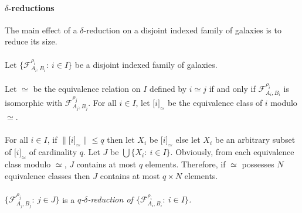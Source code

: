 \documentclass[draft]{article}
\begin{document}
\paragraph{$\delta$-reductions}
%
%
The main effect of a $\delta$-reduction on a disjoint indexed family of galaxies is to reduce its size.
%
%
\\
\\
%
%
%
%
Let $\{{\mathcal F}_{A_{i},B_{i}}^{\rho_{i}}:\ i{\in}I\}$ be a disjoint indexed family of galaxies.
%
%
\\
\\
%
%
Let $\simeq$ be the equivalence relation on $I$ defined by $i{\simeq}j$ if and only if ${\mathcal F}_{A_{i},B_{i}}^{\rho_{i}}$ is isomorphic with ${\mathcal F}_{A_{j},B_{j}}^{\rho_{j}}$.
For all $i{\in}I$, let $\lbrack i\rbrack_{\simeq}$ be the equivalence class of $i$ modulo $\simeq$.
%
%
\\
\\
%
%
For all $i{\in}I$, if ${\parallel}\lbrack i\rbrack_{\simeq}{\parallel}{\leq}q$ then let $X_{i}$ be $\lbrack i\rbrack_{\simeq}$ else let $X_{i}$ be an arbitrary subset of $\lbrack i\rbrack_{\simeq}$ of cardinality $q$.
Let $J$ be $\bigcup\{X_{i}:\ i{\in}I\}$.
Obviously, from each equivalence class modulo $\simeq$, $J$ contains at most $q$ elements.
Therefore, if $\simeq$ possesses $N$ equivalence classes then $J$ contains at most $q{\times}N$ elements.
%
%
\\
\\
%
%
$\{{\mathcal F}_{A_{j},B_{j}}^{\rho_{j}}:\ j{\in}J\}$ is a {\it $q$-$\delta$-reduction of $\{{\mathcal F}_{A_{i},B_{i}}^{\rho_{i}}:\ i{\in}I\}$.}
%
%
%
%
\end{document}
